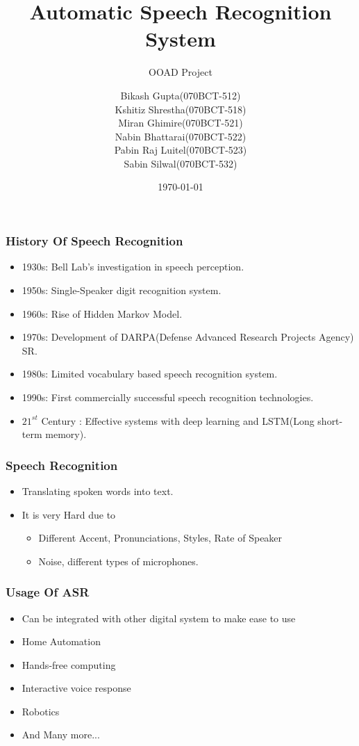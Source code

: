 \documentclass{beamer}
\title{Automatic Speech Recognition System}
\subtitle{OOAD Project}
\author{
  Bikash Gupta(070BCT-512)\\
  Kshitiz Shrestha(070BCT-518)\\
  Miran Ghimire(070BCT-521)\\
  Nabin Bhattarai(070BCT-522)\\
  Pabin Raj Luitel(070BCT-523)\\
  Sabin Silwal(070BCT-532)
}
\institute{IOE, Central Campus Pulchowk}
\date{\today}
\begin{document}
\begin{frame}
\titlepage
\end{frame}

\begin{frame}
  \centering
  \frametitle{History Of Speech Recognition}
  \begin{itemize}
  \item 1930s: Bell Lab's investigation in speech perception.
    \pause
  \item 1950s: Single-Speaker digit recognition system.
    \pause
  \item 1960s: Rise of Hidden Markov Model.
    \pause
  \item 1970s: Development of DARPA(Defense Advanced Research Projects Agency) SR.
    \pause
  \item 1980s: Limited vocabulary based speech recognition system.
    \pause
  \item 1990s: First commercially successful speech recognition technologies.
    \pause
  \item $21^{st}$ Century : Effective systems with deep learning and LSTM(Long short-term memory).
  \end{itemize}
\end{frame}

\begin{frame}
  \centering
  \frametitle{Speech Recognition}
  \begin{itemize}
    \pause
  \item Translating spoken words into text.
    \pause
  \item It is very Hard due to
    \pause
    \begin{itemize}
    \item Different Accent, Pronunciations, Styles, Rate of Speaker
      \pause
    \item Noise, different types of microphones.
    \end{itemize}
  \end{itemize}
\end{frame}

\begin{frame}
  \centering
  \frametitle{Usage Of ASR}
  \begin{itemize}
  \item Can be integrated with other digital system to make ease to use
    \pause
  \item Home Automation
    \pause
  \item Hands-free computing
    \pause
  \item Interactive voice response
    \pause
  \item Robotics
    \pause
  \item And Many more...
  \end{itemize}
\end{frame}
\end{document}
